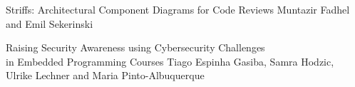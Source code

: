 \documentclass[12pt,twoside]{book}
\newcommand{\nospell}[1]{#1}
\begin{document}
  {\nospell{Striffs: Architectural Component Diagrams for Code Reviews}}
  {\nospell{Muntazir Fadhel and Emil Sekerinski}}

  {\nospell{Raising Security Awareness using Cybersecurity Challenges \\ in Embedded Programming Courses}}
  {\nospell{Tiago Espinha Gasiba, Samra Hodzic, \\ Ulrike Lechner and Maria Pinto-Albuquerque}}

\label{ref:index}
\printindex
\thispagestyle{empty}
\end{document}
